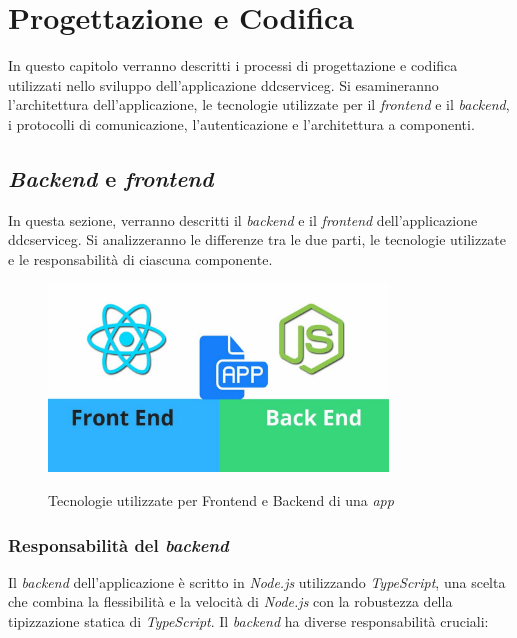 \chapter{Progettazione e Codifica}
\label{chap:design_coding}

In questo capitolo verranno descritti i processi di progettazione e codifica utilizzati nello sviluppo dell'applicazione \gls{ddcserviceg}\glox.
Si esamineranno l'architettura dell'applicazione, le tecnologie utilizzate per il \textit{frontend} e il \textit{backend}, i protocolli di comunicazione, l'autenticazione e l'architettura a componenti.

\section{\textit{Backend} e \textit{frontend}}
\label{subsec:backend_frontend}

In questa sezione, verranno descritti il \textit{backend} e il \textit{frontend} dell'applicazione \gls{ddcserviceg}\glox.
Si analizzeranno le differenze tra le due parti, le tecnologie utilizzate e le responsabilità di ciascuna componente.

\begin{figure}[H]
    \centering
    \includegraphics[alt={Rappresentazione grafica delle tecnologie per backend e frontend}, height=5cm]{img/frontendbackend.png}
    \caption{Tecnologie utilizzate per {Frontend} e {Backend} di una \textit{app}}
    \label{fig:backendfrontend}
\end{figure}

\subsection{Responsabilità del \textit{backend}}
Il \textit{backend} dell'applicazione è scritto in \textit{Node.js} utilizzando \textit{TypeScript}, una scelta che combina la flessibilità e la velocità di \textit{Node.js} con la robustezza della tipizzazione statica di \textit{TypeScript}.
Il \textit{backend} ha diverse responsabilità cruciali:

